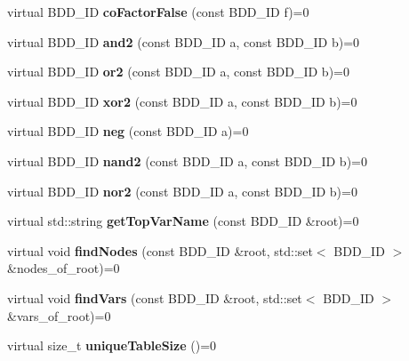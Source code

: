 \begin{DoxyCompactItemize}
\item 
virtual B\+D\+D\+\_\+\+ID {\bfseries co\+Factor\+False} (const B\+D\+D\+\_\+\+ID f)=0\label{classClassProject_1_1Manager_a248a5a627f59a767184538ea76564cd0}

\item 
virtual B\+D\+D\+\_\+\+ID {\bfseries and2} (const B\+D\+D\+\_\+\+ID a, const B\+D\+D\+\_\+\+ID b)=0\label{classClassProject_1_1Manager_a79cdf4a48c2eb03af29af3f9c29e77d4}

\item 
virtual B\+D\+D\+\_\+\+ID {\bfseries or2} (const B\+D\+D\+\_\+\+ID a, const B\+D\+D\+\_\+\+ID b)=0\label{classClassProject_1_1Manager_ab450ea2f3fbf870d349e77ac7ca25583}

\item 
virtual B\+D\+D\+\_\+\+ID {\bfseries xor2} (const B\+D\+D\+\_\+\+ID a, const B\+D\+D\+\_\+\+ID b)=0\label{classClassProject_1_1Manager_a5c28cecaf946c8f9a5c31c9229af5c5b}

\item 
virtual B\+D\+D\+\_\+\+ID {\bfseries neg} (const B\+D\+D\+\_\+\+ID a)=0\label{classClassProject_1_1Manager_aff5c65b5132c6232dd46b444beda843b}

\item 
virtual B\+D\+D\+\_\+\+ID {\bfseries nand2} (const B\+D\+D\+\_\+\+ID a, const B\+D\+D\+\_\+\+ID b)=0\label{classClassProject_1_1Manager_a32fb05421aee2ac2c363ade2c4ee96b2}

\item 
virtual B\+D\+D\+\_\+\+ID {\bfseries nor2} (const B\+D\+D\+\_\+\+ID a, const B\+D\+D\+\_\+\+ID b)=0\label{classClassProject_1_1Manager_a692ea10092ffab1681a0dacdeecae7db}

\item 
virtual std\+::string {\bfseries get\+Top\+Var\+Name} (const B\+D\+D\+\_\+\+ID \&root)=0\label{classClassProject_1_1Manager_ae27ed8a7834023b7f7f5bb89418bb854}

\item 
virtual void {\bfseries find\+Nodes} (const B\+D\+D\+\_\+\+ID \&root, std\+::set$<$ B\+D\+D\+\_\+\+ID $>$ \&nodes\+\_\+of\+\_\+root)=0\label{classClassProject_1_1Manager_a5197bad6c3e175f3dd37d9f27c8c3012}

\item 
virtual void {\bfseries find\+Vars} (const B\+D\+D\+\_\+\+ID \&root, std\+::set$<$ B\+D\+D\+\_\+\+ID $>$ \&vars\+\_\+of\+\_\+root)=0\label{classClassProject_1_1Manager_a336766e1d335bf4d52fe36c64ac8d953}

\item 
virtual size\+\_\+t {\bfseries unique\+Table\+Size} ()=0\label{classClassProject_1_1Manager_a31bcf025c3f0be7410b4d537fcc58aa4}

\end{DoxyCompactItemize}

